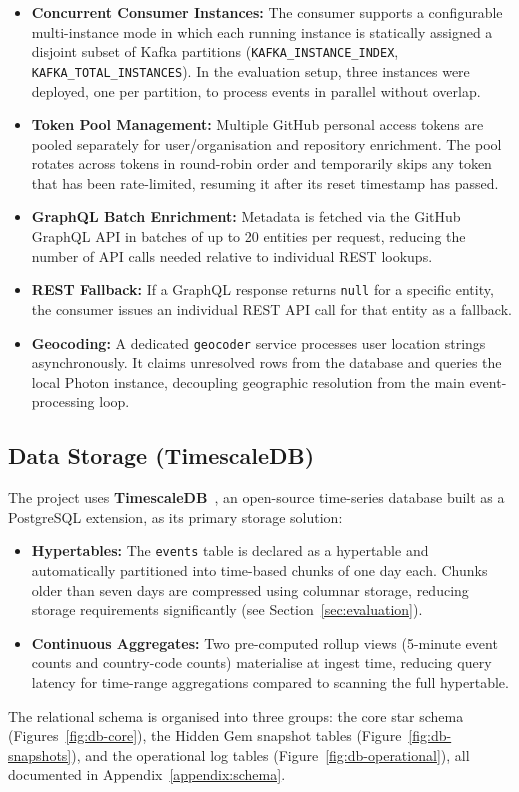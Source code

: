 \documentclass[sigconf]{acmart}
\begin{document}
\begin{itemize}
    \item \textbf{Concurrent Consumer Instances:} The consumer supports a configurable multi-instance mode in which each running instance is statically assigned a disjoint subset of Kafka partitions (\texttt{KAFKA\_INSTANCE\_INDEX}, \texttt{KAFKA\_TOTAL\_INSTANCES}). In the evaluation setup, three instances were deployed, one per partition, to process events in parallel without overlap.
    \item \textbf{Token Pool Management:} Multiple GitHub personal access tokens are pooled separately for user/organisation and repository enrichment. The pool rotates across tokens in round-robin order and temporarily skips any token that has been rate-limited, resuming it after its reset timestamp has passed.
    \item \textbf{GraphQL Batch Enrichment:} Metadata is fetched via the GitHub GraphQL API in batches of up to 20 entities per request, reducing the number of API calls needed relative to individual REST lookups.
    \item \textbf{REST Fallback:} If a GraphQL response returns \texttt{null} for a specific entity, the consumer issues an individual REST API call for that entity as a fallback.
    \item \textbf{Geocoding:} A dedicated \texttt{geocoder} service processes user location strings asynchronously. It claims unresolved rows from the database and queries the local Photon instance, decoupling geographic resolution from the main event-processing loop.
\end{itemize}
\newpage

\subsection{Data Storage (TimescaleDB)}
The project uses \textbf{TimescaleDB}~\cite{timescaledb}, an open-source time-series database built as a PostgreSQL extension, as its primary storage solution:
\begin{itemize}
    \item \textbf{Hypertables:} The \texttt{events} table is declared as a hypertable and automatically partitioned into time-based chunks of one day each. Chunks older than seven days are compressed using columnar storage, reducing storage requirements significantly (see Section~\ref{sec:evaluation}).
    \item \textbf{Continuous Aggregates:} Two pre-computed rollup views (5-minute event counts and country-code counts) materialise at ingest time, reducing query latency for time-range aggregations compared to scanning the full hypertable.
  \end{itemize}
  The relational schema is organised into three groups: the core star schema
  (Figures~\ref{fig:db-core}), the Hidden Gem snapshot tables
  (Figure~\ref{fig:db-snapshots}), and the operational log tables
  (Figure~\ref{fig:db-operational}), all documented in
  Appendix~\ref{appendix:schema}.
\end{document}
